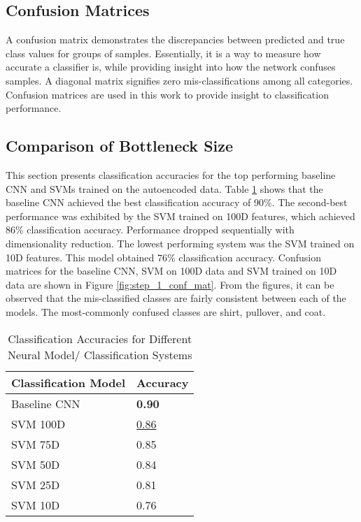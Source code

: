 \documentclass[conference]{IEEEtran}
\begin{document}
\subsection{Confusion Matrices}

A confusion matrix demonstrates the discrepancies between predicted and true class values for groups of samples.  Essentially, it is a way to measure how accurate a classifier is, while providing insight into how the network confuses samples.  A diagonal matrix signifies zero mis-classifications among all categories.  Confusion matrices are used in this work to provide insight to classification performance.

\subsection{Comparison of Bottleneck Size} \label{classification_accuracy}
This section presents classification accuracies for the top performing baseline CNN and SVMs trained on the autoencoded data.  Table \ref{tab:step1comparison} shows that the baseline CNN achieved the best classification accuracy of 90\%.  The second-best performance was exhibited by the SVM trained on 100D features, which achieved 86\% classification accuracy.  Performance dropped sequentially with dimensionality reduction.  The lowest performing system was the SVM trained on 10D features.  This model obtained 76\% classification accuracy.  Confusion matrices for the baseline CNN, SVM on 100D data and SVM trained on 10D data are shown in Figure \ref{fig:step_1_conf_mat}.
From the figures, it can be observed that the mis-classified classes are fairly consistent between each of the models.  The most-commonly confused classes are shirt, pullover, and coat.
 
 \begin{table}[h]
 	\caption{Classification Accuracies for Different Neural Model/ Classification Systems}
 	\label{tab:step1comparison}
 	\normalsize
 	\begin{tabularx}{\columnwidth}{ |X|X| } 
 		\hline
 		\centering \textbf{Classification Model}  & \textbf{Accuracy} \\
 		\hline
 		\centering Baseline CNN & \textbf{0.90} \\
 		\hline
 		\centering SVM 100D & \underline{0.86} \\
 		\hline
 		\centering SVM 75D & 0.85 \\
 		\hline
 		\centering SVM 50D & 0.84 \\
 		\hline
 		\centering SVM 25D & 0.81 \\
 		\hline
 		\centering SVM 10D & 0.76 \\
 		\hline
 	\end{tabularx}
 \end{table} 
\end{document}
